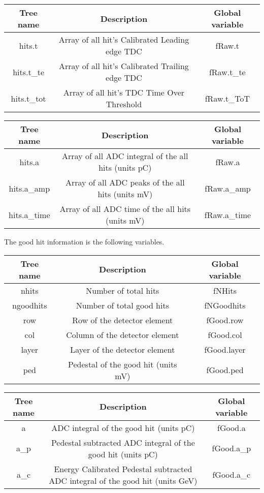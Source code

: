 \documentclass[11pt]{article}
\begin{document}
\begin{center}
\begin{tabular}{|c|c|c|}
	\hline 
	Tree name	& Description &  Global variable\\ 
	\hline 
	hits.t 	& Array of all hit's Calibrated Leading edge TDC  &fRaw.t  \\ 
	\hline 
	hits.t\_te 	&Array of all hit's  Calibrated Trailing edge TDC &fRaw.t\_te  \\ 
	\hline 
	hits.t\_tot	&Array of  all hit's TDC Time Over Threshold   &fRaw.t\_ToT  \\ 
	\hline 
\end{tabular} 
\end{center}
\begin{center}
	\begin{tabular}{|c|c|c|}
		\hline 
		Tree name	& Description &  Global variable\\ 
		\hline 
		hits.a 	& Array of all ADC integral of the all hits  (units pC)  &fRaw.a  \\ 
		\hline 
		hits.a\_amp 	& Array of all ADC peaks of the all hits  (units mV)  &fRaw.a\_amp  \\ 
		\hline 
		hits.a\_time	& Array of all ADC time of the all hits (units mV)  &fRaw.a\_time  \\ 
		\hline 
	\end{tabular} 
\end{center}

The good hit information is the following variables.

\begin{center}
\begin{tabular}{|c|c|c|}
	\hline 
Tree name	& Description &  Global variable\\ 
	\hline 
nhits	& Number of total hits & fNHits  \\ 
	\hline 
ngoodhits	& Number of total good hits & fNGoodhits \\ 
	\hline 
row 	& Row of the detector element  & fGood.row  \\ 
	\hline 
col 	& Column of the detector element  & fGood.col \\
	\hline 
layer	& Layer of the detector element  & fGood.layer \\ 
	\hline 
ped	& Pedestal of the good hit (units mV) & fGood.ped \\ 
	\hline 
\end{tabular} 
\end{center}

\begin{center}
\begin{tabular}{|c|c|c|}
	\hline 
Tree name	& Description &  Global variable\\ 
	\hline 
a	& ADC integral of the good hit (units pC)  &fGood.a  \\ 
	\hline 
a\_p	& Pedestal subtracted ADC integral of the good hit  (units pC) & fGood.a\_p \\ 
	\hline 
a\_c	& Energy Calibrated Pedestal subtracted ADC integral of the good hit (units GeV) & fGood.a\_c \\ 
\end{tabular} 
\end{center}
\end{document}
